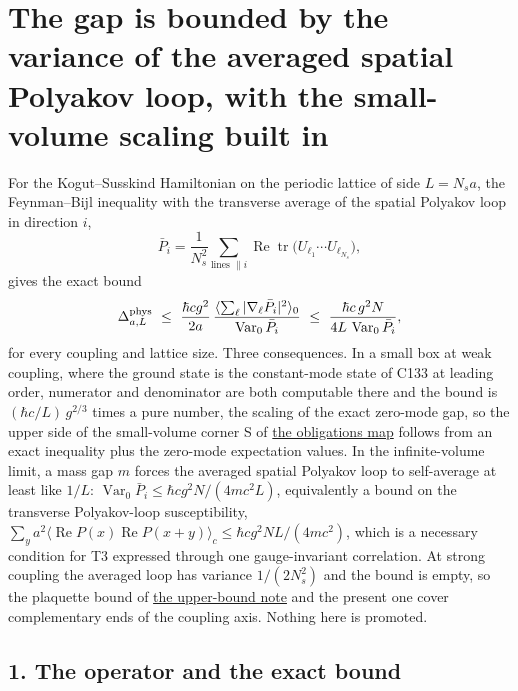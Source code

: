 \documentclass[11pt,a4paper]{article}
\begin{document}
\hypertarget{the-gap-is-bounded-by-the-variance-of-the-averaged-spatial-polyakov-loop-with-the-small-volume-scaling-built-in}{%
\section{The gap is bounded by the variance of the averaged spatial
Polyakov loop, with the small-volume scaling built
in}\label{the-gap-is-bounded-by-the-variance-of-the-averaged-spatial-polyakov-loop-with-the-small-volume-scaling-built-in}}

For the Kogut--Susskind Hamiltonian on the periodic lattice of side
\(L=N_sa\), the Feynman--Bijl inequality with the transverse average of
the spatial Polyakov loop in direction \(i\),
\[\bar P_i=\frac1{N_s^2}\sum_{\text{lines }\parallel i}\operatorname{Re}\operatorname{tr}\big(U_{\ell_1}\cdots U_{\ell_{N_s}}\big),\]
gives the exact bound
\[\Delta^{\rm phys}_{a,L}\ \le\ \frac{\hbar cg^2}{2a}\,\frac{\langle\sum_\ell|\nabla_\ell\bar P_i|^2\rangle_0}{\operatorname{Var}_0\bar P_i}
\ \le\ \frac{\hbar c\,g^2N}{4L\,\operatorname{Var}_0\bar P_i},\] for
every coupling and lattice size. Three consequences. In a small box at
weak coupling, where the ground state is the constant-mode state of C133
at leading order, numerator and denominator are both computable there
and the bound is \((\hbar c/L)\,g^{2/3}\) times a pure number, the
scaling of the exact zero-mode gap, so the upper side of the
small-volume corner S of \href{mass-gap-obligations-lattice.md}{the
obligations map} follows from an exact inequality plus the zero-mode
expectation values. In the infinite-volume limit, a mass gap \(m\)
forces the averaged spatial Polyakov loop to self-average at least like
\(1/L\): \(\operatorname{Var}_0\bar P_i\le\hbar cg^2N/(4mc^2L)\),
equivalently a bound on the transverse Polyakov-loop susceptibility,
\(\sum_{y}a^2\langle\operatorname{Re}P(x)\operatorname{Re}P(x+y)\rangle_c\le\hbar cg^2NL/(4mc^2)\),
which is a necessary condition for T3 expressed through one
gauge-invariant correlation. At strong coupling the averaged loop has
variance \(1/(2N_s^2)\) and the bound is empty, so the plaquette bound
of \href{lattice-gap-upper-bounds.md}{the upper-bound note} and the
present one cover complementary ends of the coupling axis. Nothing here
is promoted.

\hypertarget{the-operator-and-the-exact-bound}{%
\subsection{1. The operator and the exact
bound}\label{the-operator-and-the-exact-bound}}
\end{document}
